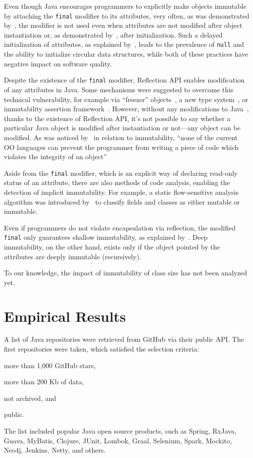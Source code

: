\documentclass[12pt]{article}
\begin{document}
Even though Java encourages programmers to explicitly make objects immutable
by attaching the \texttt{final} modifier to its attributes, very often, as was
demonstrated by~\citet{unkel2008}, the modifier is not used even when
attributes are not modified after object instantiation or, as demonstrated
by~\citet{nelson2012}, after initialization. Such a delayed initialization of attributes, as
explained by~\citet{fahndrich2007}, leads to the prevalence of \texttt{null}
and the ability to initialize circular data structures, while both of these
practices have negative impact on software quality.

Despite the existence of the \texttt{final} modifier, Reflection API enables
modification of any attributes in Java. Some mechanisms were suggested to
overcome this technical vulnerability, for example
via ``freezer'' objects~\citep{leino2008},
a new type system~\citep{tschantz2005},
or immutability assertion framework~\citep{pechtchanski2005}.
However, without any modifications to Java~\citep{steele2005},
thanks to the existence of Reflection API,
it's not possible to say whether a particular Java object is modified
after instantiation or not---any object can be modified. As was noticed
by~\citet{hakonen1999} in relation to immutability,
``none of the current OO languages can prevent the programmer from writing
a piece of code which violates the integrity of an object''

Aside from the \texttt{final} modifier, which is an explicit way of declaring
read-only status of an attribute, there are also methods of
code analysis, enabling the detection of implicit immutability. For example,
a static flow-sensitive analysis algorithm was introduced by~\citet{porat2000}
to classify fields and classes as either mutable or immutable.

Even if programmers do not violate encapsulation via reflection, the
modified \texttt{final} only guarantees shallow immutability, as
explained by~\citet{hakonen1999}. Deep immutability, on the other hand,
exists only if the object pointed by the attributes are deeply immutable
(recursively).

To our knowledge, the impact of immutability of class size has not been
analyzed yet.

\section{Empirical Results}

A list of Java repositories were retrieved from GitHub via their
public API. The first \thetotalrepos{} repositories were taken, which satisfied
the selection criteria:
\begin{enumerate*}[label={\arabic*)}]
\item more than 1,000 GitHub stars,
\item more than 200 Kb of data,
\item not archived, and
\item public.
\end{enumerate*}
The list included popular Java open source products, such as
Spring, RxJava, Guava, MyBatis, Clojure, JUnit, Lombok,
Graal, Selenium, Spark, Mockito, Neo4j, Jenkins, Netty, and others.
\end{document}
